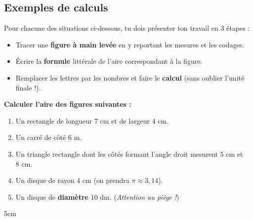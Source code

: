 \documentclass[a4paper]{book}
\begin{document}
\subsection{Exemples de calculs}

    \begin{exercice}
        Pour chacune des situations ci-dessous, tu dois présenter ton travail en 3 étapes :
        \begin{itemize}
            \item[$\bullet$] Tracer une \textbf{figure à main levée} en y reportant les mesures et les codages.
            \item[$\bullet$] Écrire la \textbf{formule} littérale de l'aire correspondant à la figure.
            \item[$\bullet$] Remplacer les lettres par les nombres et faire le \textbf{calcul} (sans oublier l'unité finale !).
        \end{itemize}
        
        \vspace{0.3cm}
        \textbf{Calculer l'aire des figures suivantes :}
        \begin{enumerate}
            \item Un rectangle de longueur $7 \text{ cm}$ et de largeur $4 \text{ cm}$.
            \item Un carré de côté $6 \text{ m}$.
            \item Un triangle rectangle dont les côtés formant l'angle droit mesurent $5 \text{ cm}$ et $8 \text{ cm}$.
            \item Un disque de rayon $4 \text{ cm}$ (on prendra $\pi \approx 3,14$).
            \item Un disque de \textbf{diamètre} $10 \text{ dm}$. (\textit{Attention au \og piège \fg !})
        \end{enumerate}
    \end{exercice}


    \begin{ZoneReponse}{5cm}
    \end{ZoneReponse}
\end{document}
